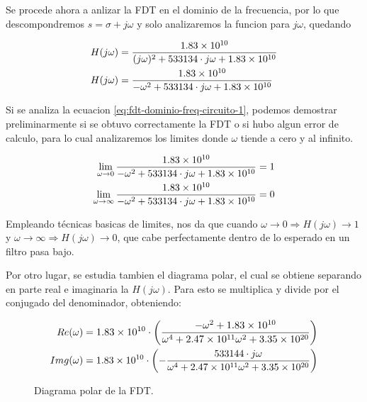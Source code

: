 Se procede ahora a anlizar la FDT en el dominio de la frecuencia, por lo que descompondremos $s = \sigma + j\omega$ y
solo analizaremos la funcion para $j\omega$, quedando

\begin{align}
  H(j\omega) &= \frac{\num{1.83d10}}{(j\omega)^2 + 533134 \cdot j\omega + \num{1.83d10}}\\
  H(j\omega) &= \frac{\num{1.83d10}}{-\omega^2 + 533134 \cdot j\omega + \num{1.83d10}}
  \label{eq:fdt-dominio-freq-circuito-1}
\end{align}

Si se analiza la ecuacion \ref{eq:fdt-dominio-freq-circuito-1}, podemos demostrar preliminarmente si se obtuvo correctamente
la FDT o si hubo algun error de calculo, para lo cual analizaremos los limites donde $\omega$ tiende a cero y al infinito.

\begin{align}
  \lim_{\omega \to 0} \frac{\num{1.83d10}}{-\omega^2 + 533134 \cdot j\omega + \num{1.83d10}} &= 1 \\
  \lim_{\omega \to \infty} \frac{\num{1.83d10}}{-\omega^2 + 533134 \cdot j\omega + \num{1.83d10}} &= 0
\end{align}

Empleando técnicas basicas de limites, nos da que cuando $\omega \to 0 \Rightarrow H(j\omega) \to 1$ y $\omega \to \infty \Rightarrow H(j\omega) \to 0$,
que cabe perfectamente dentro de lo esperado en un filtro pasa bajo. 

Por otro lugar, se estudia tambien el diagrama polar, el cual se obtiene separando en parte real e imaginaria la $H(j\omega)$.
Para esto se multiplica y divide por el conjugado del denominador, obteniendo:

\begin{align}
  Re(\omega) &= \resizebox{0.65\columnwidth}{!}{$\displaystyle \num{1.83d10} \cdot \left(\frac{-\omega^2 + \num{1.83d10}}{\omega^4 + \num{2.47d11} \omega^2 + \num{3.35d20}}\right)$} \\
  Img(\omega) &= \resizebox{0.65\columnwidth}{!}{$\displaystyle \num{1.83d10} \cdot \left(- \frac{533144 \cdot j\omega}{\omega^4 + \num{2.47d11} \omega^2 + \num{3.35d20}}\right)$}
\end{align}

\begin{figure}[H]
  \centering
  
  \caption{Diagrama polar de la FDT.}
  \label{fig:polar_circuito_1}
\end{figure}

